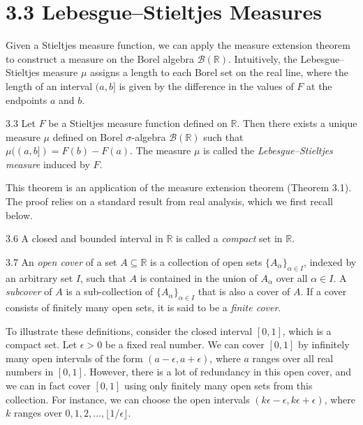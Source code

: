 \section*{3.3 Lebesgue--Stieltjes Measures}

Given a Stieltjes measure function, we can apply the measure extension theorem to construct a measure on the Borel algebra $\mathcal{B}(\mathbb{R})$. Intuitively, the Lebesgue--Stieltjes measure $\mu$ assigns a length to each Borel set on the real line, where the length of an interval $(a, b]$ is given by the difference in the values of $F$ at the endpoints $a$ and $b$.

\begin{thmbox}{3.3}
Let $F$ be a Stieltjes measure function defined on $\mathbb{R}$. Then there exists a unique measure $\mu$ defined on Borel $\sigma$-algebra $\mathcal{B}(\mathbb{R})$ such that $\mu((a, b]) = F(b) - F(a)$. The measure $\mu$ is called the \textit{Lebesgue--Stieltjes measure} induced by $F$.
\end{thmbox}
This theorem is an application of the measure extension theorem (Theorem 3.1). The proof relies on a standard result from real analysis, which we first recall below.

\begin{defbox}{3.6}
A closed and bounded interval in $\mathbb{R}$ is called a \textit{compact} set in $\mathbb{R}$.
\end{defbox}

\begin{defbox}{3.7}
An \textit{open cover} of a set $A \subseteq \mathbb{R}$ is a collection of open sets $\{A_\alpha\}_{\alpha \in I}$, indexed by an arbitrary set $I$, such that $A$ is contained in the union of $A_\alpha$ over all $\alpha \in I$. A \textit{subcover} of $A$ is a sub-collection of $\{A_\alpha\}_{\alpha \in I}$ that is also a cover of $A$. If a cover consists of finitely many open sets, it is said to be a \textit{finite cover}.
\end{defbox}

To illustrate these definitions, consider the closed interval $[0, 1]$, which is a compact set. Let $\epsilon > 0$ be a fixed real number. We can cover $[0, 1]$ by infinitely many open intervals of the form $(a - \epsilon, a + \epsilon)$, where $a$ ranges over all real numbers in $[0, 1]$. However, there is a lot of redundancy in this open cover, and we can in fact cover $[0, 1]$ using only finitely many open sets from this collection. For instance, we can choose the open intervals $(k\epsilon - \epsilon, k\epsilon + \epsilon)$, where $k$ ranges over $0, 1, 2, \dots, \lfloor 1/\epsilon \rfloor$.

